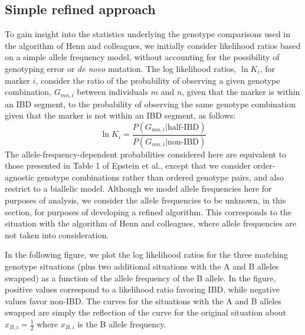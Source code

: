 \documentclass{article}
\begin{document}
\subsection{Simple refined approach}
To gain insight into the statistics underlying the genotype comparisons used in the algorithm of Henn and colleagues, we initially consider likelihood ratios based on a simple allele frequency model, without accounting for the possibility of genotyping error or \textit{de novo} mutation. The log likelihood ratios, $\ln K_i$, for marker $i$, consider the ratio of the probability of observing a given genotype combination, $G_{mn,i}$ between individuals $m$ and $n$, given that the marker is within an IBD segment, to the probability of observing the same genotype combination given that the marker is not within an IBD segment, as follows:
\begin{equation}
  \ln K_i = \frac{P(G_{mn,i} | \text{half-IBD})}{P(G_{mn,i} | \text{non-IBD})}
\end{equation}
The allele-frequency-dependent probabilities considered here are equivalent to those presented in Table 1 of Epstein et al.,\citep{RELPAIR} except that we consider order-agnostic genotype combinations rather than ordered genotype pairs, and also restrict to a biallelic model. Although we model allele frequencies here for purposes of analysis, we consider the allele frequencies to be unknown, in this section, for purposes of developing a refined algorithm. This corresponds to the situation with the algorithm of Henn and colleagues, where allele frequencies are not taken into consideration.

In the following figure, we plot the log likelihood ratios for the three matching genotype situations (plus two additional situations with the A and B alleles swapped) as a function of the allele frequency of the B allele. In the figure, positive values correspond to a likelihood ratio favoring IBD, while negative values favor non-IBD. The curves for the situations with the A and B alleles swapped are simply the reflection of the curve for the original situation about $x_{B,i}=\frac{1}{2}$ where $x_{B,i}$ is the B allele frequency.
\end{document}
